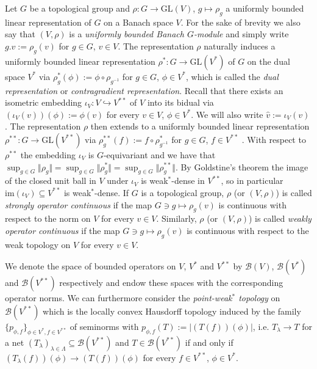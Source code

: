 \documentclass[a4paper,11pt,reqno]{amsart}
\numberwithin{equation}{section}
\theoremstyle{definition}
\theoremstyle{remark}
\theoremstyle{remark}
\begin{document}
Let $G$ be a topological group and $\rho:G\rightarrow\text{GL}(V)$, $g\mapsto\rho_{g}$ a uniformly bounded linear representation of $G$ on a Banach space $V$. For the sake of brevity we also say that $(V,\rho)$ is a \emph{uniformly bounded Banach $G$-module} and simply write $g.v:=\rho_{g}(v)$ for $g\in G$, $v\in V$. The representation $\rho$ naturally induces a uniformly bounded linear representation $\rho^{\ast}:G\rightarrow\text{GL}(V^{\ast})$ of $G$ on the dual space $V^{\ast}$ via $\rho_{g}^{\ast}(\phi):=\phi\circ\rho_{g^{-1}}$ for $g\in G$, $\phi\in V^{\ast}$, which is called the \emph{dual representation} or \emph{contragradient representation}. Recall that there exists an isometric embedding $\iota_{V}:V\hookrightarrow V^{\ast\ast}$ of $V$ into its bidual via $(\iota_{V}(v))(\phi):=\phi(v)$ for every $v\in V$, $\phi\in V^{\ast}$. We will also write $\widehat{v}:=\iota_{V}(v)$. The representation $\rho$ then extends to a uniformly bounded linear representation $\rho^{\ast\ast}:G\rightarrow\text{GL}(V^{\ast\ast})$ via $\rho_{g}^{\ast\ast}(f):=f\circ\rho_{g^{-1}}^{\ast}$ for $g\in G$, $f\in V^{\ast\ast}$ . With respect to $\rho^{\ast\ast}$ the embedding $\iota_{V}$ is $G$-equivariant and we have that $\sup_{g\in G}\Vert\rho_{g}\Vert=\sup_{g\in G}\Vert\rho_{g}^{\ast}\Vert=\sup_{g\in G}\Vert\rho_{g}^{\ast\ast}\Vert$. By Goldstine's theorem the image of the closed unit ball in $V$ under $\iota_{V}$ is weak$^{\ast}$-dense in $V^{\ast\ast}$, so in particular $\text{im}(\iota_{V})\subseteq V^{\ast\ast}$ is weak$^{\ast}$-dense. If $G$ is a topological group, $\rho$ (or $(V,\rho)$) is called \emph{strongly operator continuous} if the map $G\ni g\mapsto\rho_{g}(v)$ is continuous with respect to the norm on $V$ for every $v\in V$. Similarly, $\rho$ (or $(V,\rho)$) is called \emph{weakly operator continuous} if the map $G\ni g\mapsto\rho_{g}(v)$ is continuous with respect to the weak topology on $V$ for every $v\in V$.

We denote the space of bounded operators on $V$, $V^{\ast}$ and $V^{\ast\ast}$ by $\mathcal{B}(V)$, $\mathcal{B}(V^{\ast})$ and $\mathcal{B}(V^{\ast\ast})$ respectively and endow these spaces with the corresponding operator norms. We can furthermore consider the \emph{point-weak$^{\ast}$ topology} on $\mathcal{B}(V^{\ast\ast})$ which is the locally convex Hausdorff topology induced by the family $\{p_{\phi,f}\}_{\phi\in V^{\ast},f\in V^{\ast\ast}}$ of seminorms with $p_{\phi,f}(T):=\vert\left(T(f)\right)(\phi)\vert$, i.e. $T_{\lambda}\rightarrow T$ for a net $(T_{\lambda})_{\lambda\in\Lambda}\subseteq\mathcal{B}(V^{\ast\ast})$ and $T\in\mathcal{B}(V^{\ast\ast})$ if and only if $\left(T_{\lambda}(f)\right)(\phi)\rightarrow\left(T(f)\right)(\phi)$ for every $f\in V^{\ast\ast}$, $\phi\in V^{\ast}$.
\end{document}
